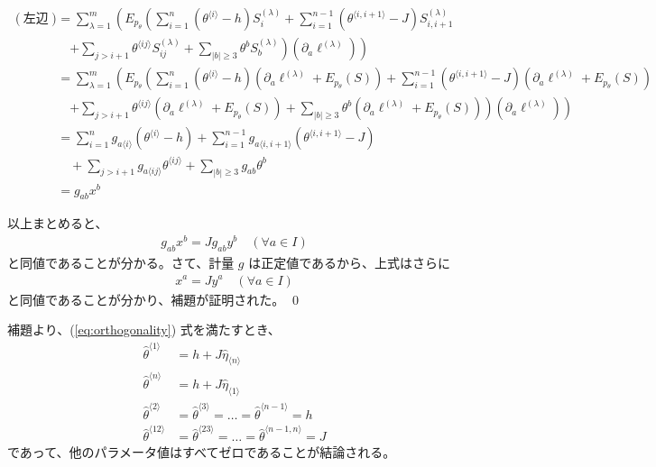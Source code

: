 \documentclass[a4paper,11pt]{jsarticle}
\numberwithin{equation}{section}
\begin{document}
\begin{align}
    (\text{左辺}) &=\sum_{\lambda=1}^{m} \left(E_{p_\theta}\left( \sum_{i=1}^{n} \left( \theta^{\langle i \rangle} - h \right) S_{i}^{(\lambda)} + \sum_{i=1}^{n-1} \left( \theta^{\langle i,i+1 \rangle} - J \right) S_{i,i+1}^{(\lambda)}\right.\right. \\
    &\quad \left. \left.+ \sum_{j > i+1} \theta^{\langle ij \rangle} S_{ij}^{(\lambda)} + \sum_{|b| \geq 3} \theta^b S_b^{(\lambda)}\right) \left( \partial_a \ell^{(\lambda)} \right) \right)\\
    &=\sum_{\lambda=1}^{m} \left(E_{p_\theta}\left( \sum_{i=1}^{n} \left( \theta^{\langle i \rangle} - h \right) (\partial_{a} \ell^{(\lambda)} + E_{p_\theta}(S)) + \sum_{i=1}^{n-1} \left( \theta^{\langle i,i+1 \rangle} - J \right) (\partial_{a} \ell^{(\lambda)} + E_{p_\theta}(S))\right.\right. \\
    &\quad \left. \left.+ \sum_{j > i+1} \theta^{\langle ij \rangle} (\partial_{a} \ell^{(\lambda)} + E_{p_\theta}(S)) + \sum_{|b| \geq 3} \theta^b (\partial_{a} \ell^{(\lambda)} + E_{p_\theta}(S))\right)\left( \partial_a \ell^{(\lambda)} \right) \right)\\
    &=\sum_{i=1}^{n} g_{a \langle i \rangle} \left( \theta^{\langle i \rangle} - h \right) + \sum_{i=1}^{n-1} g_{a \langle i,i+1 \rangle} \left( \theta^{\langle i,i+1 \rangle} - J \right) \\
    &\quad + \sum_{j > i+1} g_{a \langle ij \rangle} \theta^{\langle ij \rangle} + \sum_{|b| \geq 3} g_{ab} \theta^b\\
    &= g_{ab} x^b
\end{align}

以上まとめると、
\begin{align}
g_{ab} x^b = J g_{ab} y^b \quad (\forall a \in I)
\end{align}
と同値であることが分かる。さて、計量 $g$ は正定値であるから、上式はさらに
\begin{align}
x^a = J y^a \quad (\forall a \in I)
\end{align}
と同値であることが分かり、補題が証明された。
\qed

補題より、(\ref{eq:orthogonality}) 式を満たすとき、
\begin{align}
\hat{\theta}^{\langle 1 \rangle} &= h + J \hat{\eta}_{\langle n \rangle} \\
\hat{\theta}^{\langle n \rangle} &= h + J \hat{\eta}_{\langle 1 \rangle} \\
\hat{\theta}^{\langle 2 \rangle} &= \hat{\theta}^{\langle 3 \rangle} = \dots = \hat{\theta}^{\langle n-1 \rangle} = h \\
\hat{\theta}^{\langle 12 \rangle} &= \hat{\theta}^{\langle 23 \rangle} = \dots = \hat{\theta}^{\langle n-1,n \rangle} = J
\end{align}
であって、他のパラメータ値はすべてゼロであることが結論される。
\end{document}
